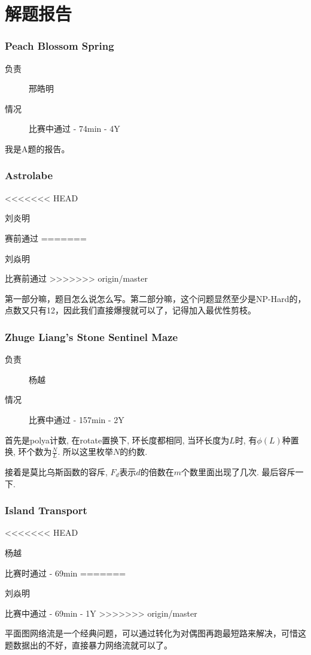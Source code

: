 \documentclass[a4paper, 11pt, nofonts, nocap, fancyhdr]{ctexart}
\newcommand{\problem}[1]{\subsubsection{#1}}
\begin{document}
\section{解题报告}


\problem{Peach Blossom Spring}

\begin{description}
\item[负责] 邢皓明
\item[情况] 比赛中通过 - 74min - 4Y
\end{description}

我是A题的报告。

\problem{Astrolabe}

\begin{description}
<<<<<<< HEAD
\item[负责] 刘炎明
\item[情况] 赛前通过
=======
\item[负责] 刘焱明
\item[情况] 比赛前通过
>>>>>>> origin/master
\end{description}

第一部分嘛，题目怎么说怎么写。第二部分嘛，这个问题显然至少是NP-Hard的，点数又只有12，因此我们直接爆搜就可以了，记得加入最优性剪枝。

\problem{Zhuge Liang's Stone Sentinel Maze}

\begin{description}
\item[负责] 杨越
\item[情况] 比赛中通过 - 157min - 2Y
\end{description}

首先是polya计数, 在rotate置换下, 环长度都相同, 当环长度为$L$时, 有$\phi(L)$种置换, 环个数为$\frac{N}{L}$. 所以这里枚举$N$的约数.

接着是莫比乌斯函数的容斥, $F_d$表示$d$的倍数在$m$个数里面出现了几次. 最后容斥一下.

\problem{Island Transport}

\begin{description}
<<<<<<< HEAD
\item[负责] 杨越
\item[情况] 比赛时通过 - 69min
=======
\item[负责] 刘焱明
\item[情况] 比赛中通过 - 69min - 1Y
>>>>>>> origin/master
\end{description}

平面图网络流是一个经典问题，可以通过转化为对偶图再跑最短路来解决，可惜这题数据出的不好，直接暴力网络流就可以了。
\end{document}
